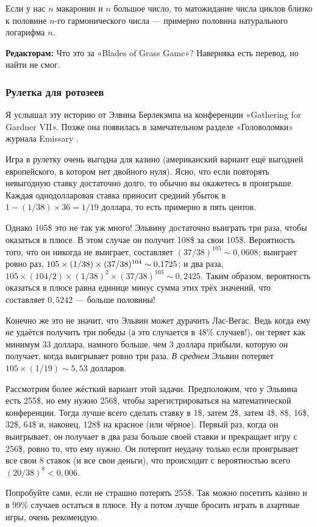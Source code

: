 Если у нас $n$ макаронин и $n$ большое число, то матожидание числа циклов близко к половине $n$-го гармонического числа --- примерно половина натурального логарифма $n$.

\begin{addedbytheeditors}
\textbf{Редакторам:} Что это за «Blades of Grass Game»? Наверняка есть перевод, но найти не смог. 
\end{addedbytheeditors}


\subsubsection*{Рулетка для ротозеев}

Я услышал эту историю от Элвина Берлекэмпа на конференции
«Gathering for Gardner VII».
Позже она появилась в замечательном разделе «Головоломки» журнала Emissary \cite[весна/осень 2006 года]{3}.

Игра в рулетку очень выгодна для казино (американский вариант ещё выгодней европейского, в котором нет двойного нуля).
Ясно, что если повторять невыгодную ставку достаточно долго, то обычно вы окажетесь в проигрыше.
Каждая однодолларовая ставка приносит средний убыток в  $1 - (1/38) \times 36 = 1/19$ доллара, то есть примерно в пять центов.

Однако 105\$ это не так уж много!
Эльвину достаточно выиграть три раза, чтобы оказаться в плюсе.
В этом случае он получит 108\$ за свои 105\$.
Вероятность того, что он никогда не выиграет, составляет $(37/38)^{105} \sim 0{,}0608$;
выиграет ровно раз, $105 \times (1/38) \times (37/38)^{104} \z\sim 0{,}1725$;
и два раза, $105 \times (104/2) \times (1/38)^2 \times (37/38)^{103} \sim 0{,}2425$.
Таким образом, вероятность оказаться в плюсе равна единице минус сумма этих трёх значений, что составляет $0{,}5242$ --- больше половины!

Конечно же это не значит, что Эльвин может дурачить Лас-Вегас.
Ведь когда ему \emph{не} удаётся получить три победы (а это случается в 48\% случаев!), он теряет как минимум 33 доллара, намного больше, чем 3 доллара прибыли, которую он получает, когда выигрывает ровно три раза.
\emph{В среднем} Эльвин потеряет $105 \times (1/19) \sim 5{,}53$ долларов.

Рассмотрим более жёсткий вариант этой задачи.
Предположим, что у Эльвина есть 255\$, но ему нужно 256\$, чтобы зарегистрироваться на математической конференции.
Тогда лучше всего сделать ставку в 1\$, затем 2\$, затем 4\$, 8\$, 16\$, 32\$, 64\$ и, наконец, 128\$ на красное (или чёрное).
Первый раз, когда он выигрывает, он получает в два раза больше своей ставки и прекращает игру с 256\$, ровно то, что ему нужно.
Он потерпит неудачу только если проигрывает все свои $8$ ставок (и все свои деньги), что происходит с вероятностью всего $(20/38)^8 < 0{,}006$.

Попробуйте сами, если не страшно потерять 255\$.
Так можно посетить казино и в 99\% случаев остаться в плюсе.
Ну а потом лучше бросить играть в азартные игры, очень рекомендую.
